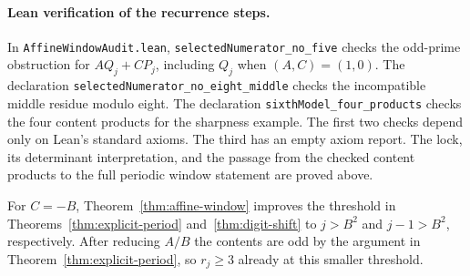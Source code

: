 \documentclass[11pt]{amsart}
\theoremstyle{definition}
\theoremstyle{remark}
\numberwithin{equation}{section}
\begin{document}
\paragraph{Lean verification of the recurrence steps.} In \texttt{AffineWindow\allowbreak{}Audit.lean}, \texttt{selected\allowbreak{}Numerator\_\allowbreak{}no\_\allowbreak{}five}
checks the odd-prime obstruction for $AQ_j+CP_j$, including $Q_j$ when
$(A,C)=(1,0)$. The declaration \texttt{selected\allowbreak{}Numerator\_\allowbreak{}no\_\allowbreak{}eight\_\allowbreak{}middle}
checks the incompatible middle residue modulo eight.
The declaration \texttt{sixthModel\_\allowbreak{}four\_\allowbreak{}products} checks the four
content products for the sharpness example. The first two checks depend
only on Lean's standard axioms. The third has an empty axiom report.
The lock, its determinant interpretation, and the passage from the
checked content products to the full periodic window statement are
proved above.

For $C=-B$, Theorem~\ref{thm:affine-window} improves the
threshold in Theorems~\ref{thm:explicit-period} and~\ref{thm:digit-shift}
to $j>B^2$ and $j-1>B^2$, respectively. After reducing $A/B$
the contents are odd by the argument in Theorem~\ref{thm:explicit-period},
so $r_j\ge3$ already at this smaller threshold.
\end{document}
